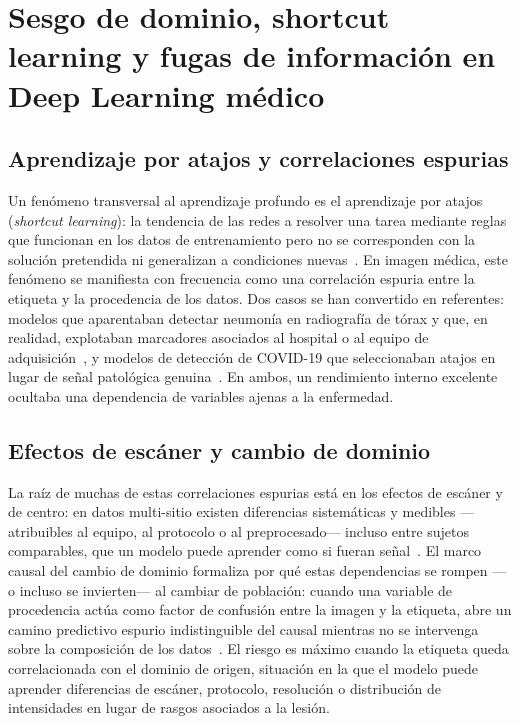 \section{Sesgo de dominio, shortcut learning y fugas de información en Deep Learning médico}

\subsection{Aprendizaje por atajos y correlaciones espurias}

Un fenómeno transversal al aprendizaje profundo es el aprendizaje por atajos
(\emph{shortcut learning}): la tendencia de las redes a resolver una tarea
mediante reglas que funcionan en los datos de entrenamiento pero no se
corresponden con la solución pretendida ni generalizan a condiciones
nuevas~\cite{geirhos2020shortcut}. En imagen médica, este fenómeno se manifiesta
con frecuencia como una correlación espuria entre la etiqueta y la procedencia de
los datos. Dos casos se han convertido en referentes: modelos que aparentaban
detectar neumonía en radiografía de tórax y que, en realidad, explotaban
marcadores asociados al hospital o al equipo de adquisición~\cite{zech2018pneumonia},
y modelos de detección de COVID-19 que seleccionaban atajos en lugar de
señal patológica genuina~\cite{degrave2021shortcuts}. En ambos, un rendimiento
interno excelente ocultaba una dependencia de variables ajenas a la enfermedad.

\subsection{Efectos de escáner y cambio de dominio}

La raíz de muchas de estas correlaciones espurias está en los efectos de escáner
y de centro: en datos multi-sitio existen diferencias sistemáticas y medibles
---atribuibles al equipo, al protocolo o al preprocesado--- incluso entre sujetos
comparables, que un modelo puede aprender como si fueran señal~\cite{glocker2019scanner}.
El marco causal del cambio de dominio formaliza por qué estas dependencias se
rompen ---o incluso se invierten--- al cambiar de población: cuando una variable
de procedencia actúa como factor de confusión entre la imagen y la etiqueta, abre
un camino predictivo espurio indistinguible del causal mientras no se intervenga
sobre la composición de los datos~\cite{castro2020causality}. El riesgo es máximo
cuando la etiqueta queda correlacionada con el dominio de origen, situación en la
que el modelo puede aprender diferencias de escáner, protocolo, resolución o
distribución de intensidades en lugar de rasgos asociados a la lesión.

